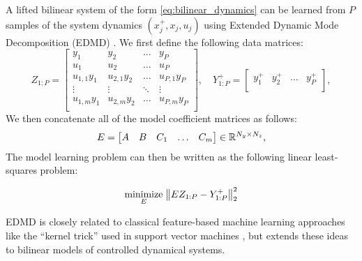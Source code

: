 \documentclass[../root.tex]{subfiles}
\newcommand{\changed}[1]{{\color{black} #1}}
\begin{document}
A lifted bilinear system of the form \eqref{eq:bilinear_dynamics} can be learned
from $P$ samples of the system dynamics $(x_j^+,x_j,u_j)$ using Extended Dynamic
Mode Decomposition (EDMD) \cite{williams_Data_2015,folkestad_Koopman_2021}. We
first define the following data matrices:
\begin{equation}
  Z_{1:P} = \begin{bmatrix}
    y_1         & y_2         & \dots  & y_P          \\
    u_1         & u_2         & \dots  & u_P          \\
    u_{1,1} y_1 & u_{2,1} y_2 & \dots  & u_{P,1} y_P  \\
    \vdots      & \vdots      & \ddots & \vdots       \\
    u_{1,m} y_1 & u_{2,m} y_2 & \dots  & u_{P,m} y_P  \\
  \end{bmatrix}, \quad 
  Y_{1:P}^+ = \begin{bmatrix}
    y_1^+         & y_2^+         & \dots  & y_P^+    \\
  \end{bmatrix},
\end{equation}
We then concatenate all of the model coefficient matrices as follows:
\begin{equation} \label{eq:E_matrixdef}
  E = \begin{bmatrix} A & B & C_1 & \dots & C_m \end{bmatrix} \in \mathbb{R}^{N_y \times N_z},
\end{equation}
The model learning problem can then be written as the following linear least-squares problem:

\begin{align} \label{opt:edmd}
  \underset{E}{\text{minimize}} \; \norm{E Z_{1:P} - Y_{1:P}^+}_2^2
\end{align}

\changed{EDMD is closely related to classical feature-based machine learning
approaches like the ``kernel trick'' used in support vector machines
\cite{kutz_Dynamic_2016}, but extends these ideas to bilinear models of
controlled dynamical systems.}


\end{document}
